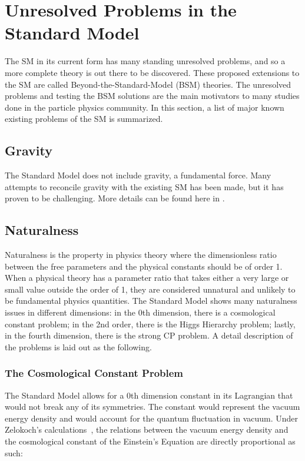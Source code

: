 \section{Unresolved Problems in the Standard Model}
\label{sec:UnresolvedSM}
The SM in its current form has many standing unresolved problems, and so a more complete theory is out there to be discovered. These proposed extensions to the SM are called Beyond-the-Standard-Model (BSM) theories. The unresolved problems and testing the BSM solutions are the main motivators to many studies done in the particle physics community. In this section, a list of major known existing problems of the SM is summarized.

\subsection{Gravity}
The Standard Model does not include gravity, a fundamental force. Many attempts to reconcile gravity with the existing SM has been made, but it has proven to be challenging. More details can be found here in \cite{sep-quantum-gravity}.

\subsection{Naturalness}
Naturalness is the property in physics theory where the dimensionless ratio between the free parameters and the physical constants should be of order 1. When a physical theory has a parameter ratio that takes either a very large or small value outside the order of 1, they are considered unnatural and unlikely to be fundamental physics quantities. The Standard Model shows many naturalness issues in different dimensions: in the 0th dimension, there is a cosmological constant problem; in the
2nd order, there is the Higgs Hierarchy problem; lastly, in the fourth dimension, there is the strong CP problem. A detail description of the problems is laid out as the following.

\subsubsection{The Cosmological Constant Problem}
The Standard Model allows for a 0th dimension constant in its Lagrangian that would not break any of its symmetries. The constant would represent the vacuum energy density and would account for the quantum fluctuation in vacuum. Under Zelokoch's calculations~\cite{zel1968cosmological}, the relations between the vacuum energy density and the cosmological constant of the Einstein's Equation are directly proportional as such:

